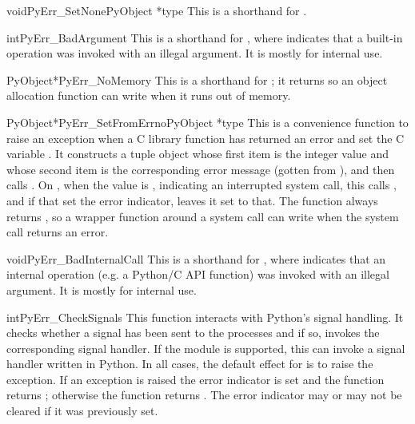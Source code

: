 \documentclass{manual}
\begin{document}
\begin{cfuncdesc}{void}{PyErr_SetNone}{PyObject *type}
This is a shorthand for .
\end{cfuncdesc}

\begin{cfuncdesc}{int}{PyErr_BadArgument}{}
This is a shorthand for , where  indicates that a built-in operation
was invoked with an illegal argument.  It is mostly for internal use.
\end{cfuncdesc}

\begin{cfuncdesc}{PyObject*}{PyErr_NoMemory}{}
This is a shorthand for ; it
returns \NULL{} so an object allocation function can write
 when it runs out of memory.
\end{cfuncdesc}

\begin{cfuncdesc}{PyObject*}{PyErr_SetFromErrno}{PyObject *type}
This is a convenience function to raise an exception when a C library
function has returned an error and set the C variable .
It constructs a tuple object whose first item is the integer
 value and whose second item is the corresponding error
message (gotten from ), and
then calls
.  On \UNIX{}, when
the  value is , indicating an interrupted
system call, this calls , and if that set
the error indicator, leaves it set to that.  The function always
returns \NULL{}, so a wrapper function around a system call can write 
 when  the system call returns an
error.
\end{cfuncdesc}

\begin{cfuncdesc}{void}{PyErr_BadInternalCall}{}
This is a shorthand for , where  indicates that an internal
operation (e.g. a Python/C API function) was invoked with an illegal
argument.  It is mostly for internal use.
\end{cfuncdesc}

\begin{cfuncdesc}{int}{PyErr_CheckSignals}{}
This function interacts with Python's signal handling.  It checks
whether a signal has been sent to the processes and if so, invokes the
corresponding signal handler.  If the
 module is supported, this can
invoke a signal handler written in Python.  In all cases, the default
effect for  is to raise the
 exception.  If an exception is raised the 
error indicator is set and the function returns ; otherwise
the function returns .  The error indicator may or may not be
cleared if it was previously set.
\end{cfuncdesc}
\end{document}
